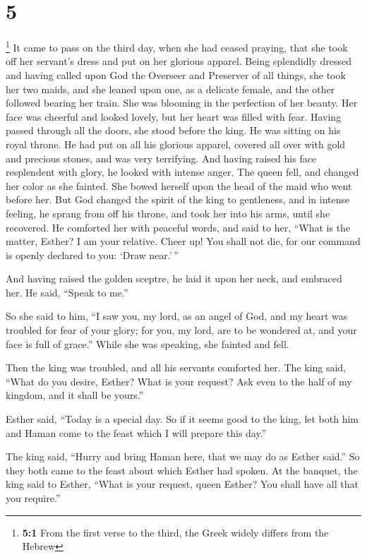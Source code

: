 \hypertarget{section-4}{%
\section{5}\label{section-4}}

 \footnote{\textbf{5:1} From the first verse to the third,
  the Greek widely differs from the Hebrew} It came to pass on the third
day, when she had ceased praying, that she took off her servant's dress
and put on her glorious apparel. Being splendidly dressed and having
called upon God the Overseer and Preserver of all things, she took her
two maids, and she leaned upon one, as a delicate female, and the other
followed bearing her train. She was blooming in the perfection of her
beauty. Her face was cheerful and looked lovely, but her heart was
filled with fear. Having passed through all the doors, she stood before
the king. He was sitting on his royal throne. He had put on all his
glorious apparel, covered all over with gold and precious stones, and
was very terrifying. And having raised his face resplendent with glory,
he looked with intense anger. The queen fell, and changed her color as
she fainted. She bowed herself upon the head of the maid who went before
her. But God changed the spirit of the king to gentleness, and in
intense feeling, he sprang from off his throne, and took her into his
arms, until she recovered. He comforted her with peaceful words, and
said to her, ``What is the matter, Esther? I am your relative. Cheer up!
You shall not die, for our command is openly declared to you: `Draw
near.'\,''

 And having raised the golden sceptre, he laid it upon her
neck, and embraced her. He said, ``Speak to me.''

So she said to him, ``I saw you, my lord, as an angel of God, and my
heart was troubled for fear of your glory; for you, my lord, are to be
wondered at, and your face is full of grace.'' While she was speaking,
she fainted and fell.

Then the king was troubled, and all his servants comforted her.
 The king said, ``What do you desire, Esther? What is your
request? Ask even to the half of my kingdom, and it shall be yours.''

 Esther said, ``Today is a special day. So if it seems
good to the king, let both him and Haman come to the feast which I will
prepare this day.''

 The king said, ``Hurry and bring Haman here, that we may
do as Esther said.'' So they both came to the feast about which Esther
had spoken.  At the banquet, the king said to Esther,
``What is your request, queen Esther? You shall have all that you
require.''

